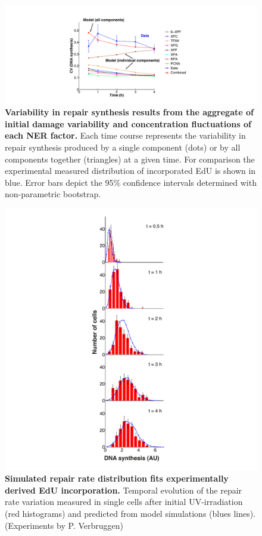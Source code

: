 \begin{figure}[h]
	\begin{center}
		\includegraphics[width=1\textwidth]{Abbildungen/figure3_8.pdf}
		\caption{\textbf{Variability in repair synthesis results from the aggregate of initial damage variability and concentration fluctuations of each NER factor.} Each time course represents the variability in repair synthesis produced by a single component (dots) or by all components together (triangles) at a given time. For comparison the experimental measured distribution of incorporated EdU is shown in blue. Error bars depict the 95\% confidence intervals determined with non-parametric bootstrap.}
		\label{fig:CV_Var_comp}
	\end{center}
\end{figure}

\begin{figure}[h]
	\begin{center}
		\includegraphics[width=1\textwidth]{Abbildungen/figure3_7.pdf}
		\caption{\textbf{Simulated repair rate distribution fits experimentally derived EdU incorporation.} Temporal evolution of the repair rate variation  measured in single cells after initial UV-irradiation (red histograms) and predicted from model simulations (blues lines). (Experiments by P. Verbruggen)}
		\label{fig:ModelData_tempVar}
	\end{center}
\end{figure}
\clearpage

